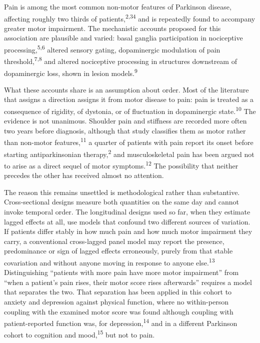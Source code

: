 \documentclass[
  english,
  12pt,
]{article}
\begin{document}
Pain is among the most common non-motor features of Parkinson disease, affecting roughly two thirds of patients,\textsuperscript{2,34} and is repeatedly found to accompany greater motor impairment. The mechanistic accounts proposed for this association are plausible and varied: basal ganglia participation in nociceptive processing,\textsuperscript{5,6} altered sensory gating, dopaminergic modulation of pain threshold,\textsuperscript{7,8} and altered nociceptive processing in structures downstream of dopaminergic loss, shown in lesion models.\textsuperscript{9}

What these accounts share is an assumption about order. Most of the literature that assigns a direction assigns it from motor disease to pain: pain is treated as a consequence of rigidity, of dystonia, or of fluctuation in dopaminergic state.\textsuperscript{10} The evidence is not unanimous. Shoulder pain and stiffness are recorded more often two years before diagnosis, although that study classifies them as motor rather than non-motor features,\textsuperscript{11} a quarter of patients with pain report its onset before starting antiparkinsonian therapy,\textsuperscript{2} and musculoskeletal pain has been argued not to arise as a direct sequel of motor symptoms.\textsuperscript{12} The possibility that neither precedes the other has received almost no attention.

The reason this remains unsettled is methodological rather than substantive. Cross-sectional designs measure both quantities on the same day and cannot invoke temporal order. The longitudinal designs used so far, when they estimate lagged effects at all, use models that confound two different sources of variation. If patients differ stably in how much pain and how much motor impairment they carry, a conventional cross-lagged panel model may report the presence, predominance or sign of lagged effects erroneously, purely from that stable covariation and without anyone moving in response to anyone else.\textsuperscript{13} Distinguishing ``patients with more pain have more motor impairment'' from ``when a patient's pain rises, their motor score rises afterwards'' requires a model that separates the two. That separation has been applied in this cohort to anxiety and depression against physical function, where no within-person coupling with the examined motor score was found although coupling with patient-reported function was, for depression,\textsuperscript{14} and in a different Parkinson cohort to cognition and mood,\textsuperscript{15} but not to pain.
\end{document}
